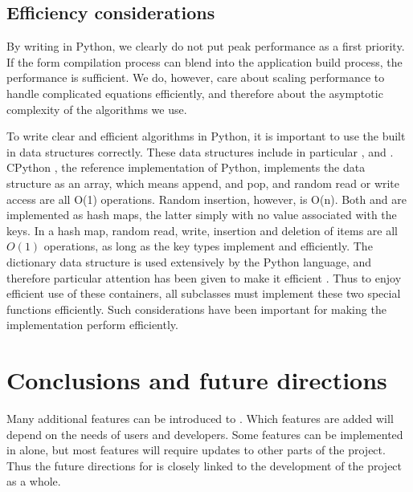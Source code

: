 \subsection{Efficiency considerations}

By writing \ufl{} in Python, we clearly do not put peak performance
as a first priority. If the form compilation process can blend into
the application build process, the performance is sufficient.  We do,
however, care about scaling performance to handle complicated equations
efficiently, and therefore about the asymptotic complexity of the
algorithms we use.

To write clear and efficient algorithms in Python, it is important
to use the built in data structures correctly.  These data structures
include in particular ,  and .  CPython
\citep{Rossumothers}, the reference implementation of Python, implements
the data structure  as an array, which means append,
and pop, and random read or write access are all O(1) operations.
Random insertion, however, is O(n).  Both  and  are
implemented as hash maps, the latter simply with no value associated
with the keys. In a hash map, random read, write, insertion and
deletion of items are all $O(1)$ operations, as long as the key types
implement  and  efficiently. The
dictionary data structure is used extensively by the Python language,
and therefore particular attention has been given to make it efficient
\citep{Kuchling2007}.  Thus to enjoy efficient use of these containers,
all  subclasses must implement these two special functions
efficiently. Such considerations have been important for making the \ufl{}
implementation perform efficiently.

\section{Conclusions and future directions}
\label{ufl:sec:future}

Many additional features can be introduced to \ufl{}.  Which features
are added will depend on the needs of \fenics{} users and developers.
Some features can be implemented in \ufl{} alone, but most features
will require updates to other parts of the \fenics{} project. Thus the
future directions for \ufl{} is closely linked to the development of
the \fenics{} project as a whole.

